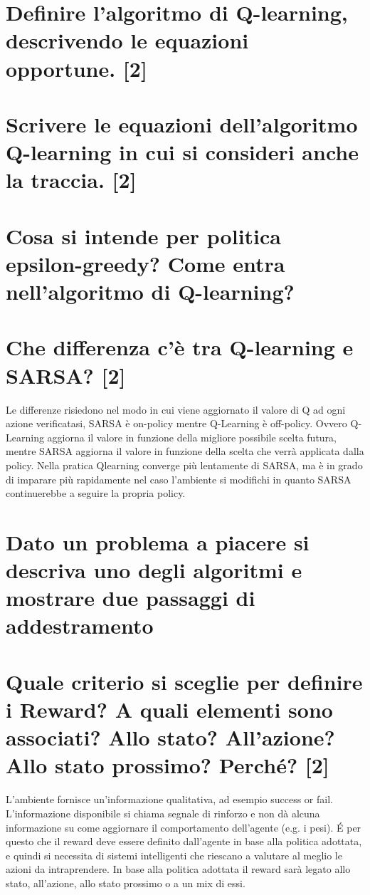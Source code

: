 \documentclass[\main/main.tex]{subfiles}
\begin{document}
\section{Definire l’algoritmo di Q-learning, descrivendo le equazioni opportune. [2]}
\section{Scrivere le equazioni dell'algoritmo Q-learning in cui si consideri anche la traccia. [2]}
\section{Cosa si intende per politica epsilon-greedy? Come entra nell’algoritmo di Q-learning? }
\section{Che differenza c'è tra Q-learning e SARSA? [2]}
Le differenze risiedono nel modo in cui viene aggiornato il valore di Q ad ogni azione verificatasi, SARSA è on-policy mentre Q-Learning è off-policy. Ovvero Q­Learning aggiorna il valore in funzione della migliore possibile scelta futura, mentre SARSA aggiorna il valore in funzione della scelta che verrà applicata dalla policy. Nella pratica Q­learning converge più lentamente di SARSA, ma è in grado di imparare più rapidamente nel caso l’ambiente si modifichi in quanto SARSA continuerebbe a seguire la propria policy.

\section{Dato un problema a piacere si descriva uno degli algoritmi e mostrare due passaggi di addestramento}
\section{Quale criterio si sceglie per definire i Reward? A quali elementi sono associati? Allo stato? All'azione? Allo stato prossimo? Perché? [2]}
L'ambiente fornisce un'informazione qualitativa, ad esempio success or fail.
L'informazione disponibile si chiama segnale di rinforzo e non dà alcuna informazione su come aggiornare il comportamento dell'agente (e.g. i pesi).
É per questo che il reward deve essere definito dall'agente in base alla politica adottata, e quindi si necessita di sistemi intelligenti che riescano a valutare al meglio le azioni da intraprendere.
In base alla politica adottata il reward sarà legato allo stato, all'azione, allo stato prossimo o a un mix di essi.
\end{document}
